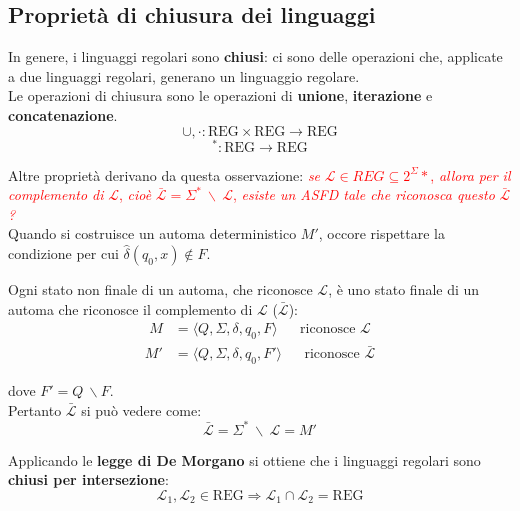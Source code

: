 \documentclass[12pt, a4paper, oneside]{book}
\begin{document}
  \subsection{Proprietà di chiusura dei linguaggi}
  In genere, i linguaggi regolari sono \textbf{chiusi}: ci sono delle operazioni che, applicate a due linguaggi regolari, generano un linguaggio regolare. \\[0.2ex]
  Le operazioni di chiusura sono le operazioni di \textcolor{azzurrino}{\textbf{unione}}, \textcolor{azzurrino}{\textbf{iterazione}} e \textcolor{azzurrino}{\textbf{concatenazione}}.
  \begin{equation*}
    \cup, \cdot : \text{REG} \times \text{REG} \rightarrow \text{REG}
  \end{equation*}
  \begin{equation*}
    ^* : \text{REG} \rightarrow \text{REG}
  \end{equation*}

  Altre proprietà derivano da questa osservazione: \textcolor{red}{\textit{se} $\mathcal{L} \in REG \subseteq 2^{\Sigma}*$, \textit{allora per il complemento di} $\mathcal{L}$, \textit{cioè} $\bar{\mathcal{L}} = \Sigma^* \ \backslash \ \mathcal{L}$, \textit{esiste un ASFD tale che riconosca questo} $\bar{\mathcal{L}}$ \textit{?}} \\[0.2ex]
  Quando si costruisce un automa deterministico $M'$, occore rispettare la condizione per cui $\hat{\delta}(q_0,x) \notin F$.


  Ogni stato non finale di un automa, che riconosce $\mathcal{L}$, è uno stato finale di un automa che riconosce il complemento di $\mathcal{L}$ ($\bar{\mathcal{L}}$):
  \begin{align*}
    M &= \langle Q, \Sigma, \delta, q_0, F \rangle && \text{riconosce } \mathcal{L}
  \end{align*}
  \begin{align*}
    M' &= \langle Q, \Sigma, \delta, q_0, F' \rangle && \text{riconosce } \bar{\mathcal{L}}
  \end{align*}

  dove $F' = Q \ \backslash F$. \\[0.2ex]
  Pertanto $\bar{\mathcal{L}}$ si può vedere come:
  \begin{equation*}
    \bar{\mathcal{L}} = \Sigma^* \ \backslash \ \mathcal{L} = M'
  \end{equation*}

  Applicando le \textbf{legge di De Morgano} si ottiene che i linguaggi regolari sono \textcolor{azzurrino}{\textbf{chiusi per intersezione}}:
  \begin{equation*}
    \mathcal{L}_1, \mathcal{L}_2 \in \text{REG} \Rightarrow \mathcal{L}_1 \cap \mathcal{L}_2 = \text{REG}
  \end{equation*}
\end{document}
